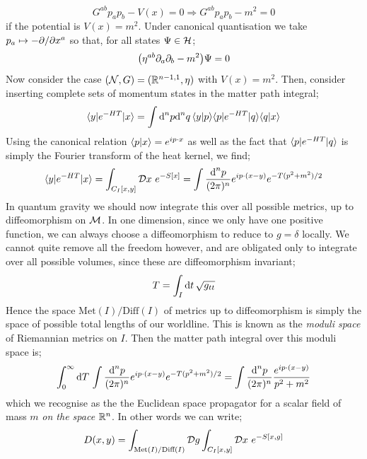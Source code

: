 \begin{equation*}
G^{ab}p_a p_b - V(x) = 0 \Rightarrow G^{ab}p_a p_b - m^2 = 0
\end{equation*}
if the potential is $V(x) = m^2$. Under canonical quantisation we take $p_a \mapsto -\partial/\partial x^{a}$ so that, for all states $\Psi \in \mathcal{H}$;
\begin{equation*}
\left(\eta^{ab}\del_a \del_b - m^2\right)\Psi = 0
\end{equation*}
Now consider the case $(\mathcal{N}, G) = (\mathbb{R}^{n-1,1}, \eta)$ with $V(x) = m^2$. Then, consider inserting complete sets of momentum states in the matter path integral;
\begin{equation*}
\bra{y}e^{-HT}\ket{x} = \int{\ud^n p \upd{^{n} q}\braket{y}{p}\bra{p}e^{-HT}\ket{q}\braket{q}{x}}
\end{equation*}
Using the canonical relation $\braket{p}{x} = e^{ip\cdot x}$ as well as the fact that $\bra{p}e^{-HT}\ket{q}$ is simply the Fourier transform of the heat kernel, we find;
\begin{equation*}
\bra{y}e^{-HT}\ket{x} = \int_{C_I[x, y]}{\mD x\,\, e^{-S[x]}} = \int{\frac{\ud^n p}{(2\pi)^{n}}e^{ip\cdot(x - y)}e^{-T(p^2 + m^2)/2}}
\end{equation*}
In quantum gravity we should now integrate this over all possible metrics, up to diffeomorphism on $\mathcal{M}$. In one dimension, since we only have one positive function, we can always choose a diffeomorphism to reduce to $g = \delta$ locally. We cannot quite remove all the freedom however, and are obligated only to integrate over all possible volumes, since these are diffeomorphism invariant;
\begin{equation*}
T = \int_I{\text{d}t \,\sqrt{g_{tt}}}
\end{equation*}
Hence the space $\text{Met}(I)/\text{Diff}(I)$ of metrics up to diffeomorphism is simply the space of possible total lengths of our worldline. This is known as the \emph{moduli space} of Riemannian metrics on $I$. Then the matter path integral over this moduli space is;
\begin{equation*}
\int_0^{\infty}{\text{d}T \,\int{\frac{\text{d}^n p}{(2\pi)^{n}}e^{ip\cdot(x - y)}e^{-T(p^2 + m^2)/2}}} = \int{\frac{\text{d}^n p}{(2\pi)^{n}}\frac{e^{ip\cdot(x - y)}}{p^2 + m^2}}
\end{equation*}
which we recognise as the the Euclidean space propagator for a scalar field of mass $m$ \emph{on the space} $\mathbb{R}^{n}$. In other words we can write;
\begin{equation*}
D(x, y) = \int_{\text{Met}(I)/\text{Diff}(I)}{\mathcal{D} g\int_{C_I[x,y]}{\mathcal{D} x\,\, e^{-S[x,g]}}}
\end{equation*}
